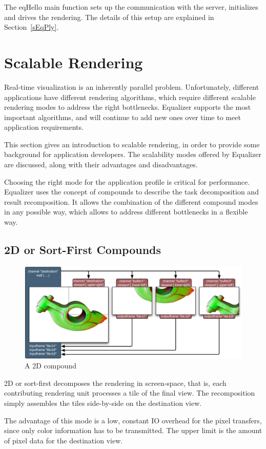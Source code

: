 \documentclass[10pt,a4]{scrartcl}
\newcommand{\sref}[1]{Section~\ref{#1}}
\begin{document}
The \textsf{eqHello} main function sets up the communication with the
server, initializes and drives the rendering. The details of this setup
are explained in \sref{sEqPly}.


\section{Scalable Rendering}

Real-time visualization is an inherently parallel
problem. Unfortunately, different applications have different rendering
algorithms, which require different scalable rendering modes to address
the right bottlenecks. Equalizer supports the most important algorithms,
and will continue to add new ones over time to meet application
requirements.

This section gives an introduction to scalable rendering, in order to
provide some background for application developers. The scalability
modes offered by Equalizer are discussed, along with their advantages
and disadvantages. 

Choosing the right mode for the application profile is critical for
performance. Equalizer uses the concept of compounds to describe the
task decomposition and result recomposition. It allows the combination
of the different compound modes in any possible way, which allows to
address different bottlenecks in a flexible way.


\subsection{2D or Sort-First Compounds}

\begin{figure}
  \includegraphics[width=.618\textwidth]{images/2D.pdf}
  {\caption{\small A 2D compound}}
\end{figure}
2D or sort-first decomposes the rendering in screen-space, that is, each
contributing rendering unit processes a tile of the final view. The
recomposition simply assembles the tiles side-by-side on the destination
view. 

The advantage of this mode is a low, constant IO overhead for the pixel
transfers, since only color information has to be transmitted. The upper
limit is the amount of pixel data for the destination view.
\end{document}
